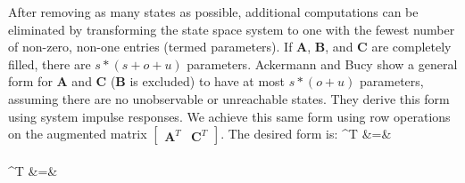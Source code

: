 \label{sec:parameter-reduction}

After removing as many states as possible, additional computations can
be eliminated by transforming the state space system to one with the
fewest number of non-zero, non-one entries (termed parameters). If
$\mathbf{A}$, $\mathbf{B}$, and $\mathbf{C}$ are completely filled,
there are $s*(s+o+u)$ parameters. Ackermann and Bucy
\cite{Ackermann/Bucy} show a general form for $\mathbf{A}$ and
$\mathbf{C}$ ($\mathbf{B}$ is excluded) to have at most $s*(o+u)$
parameters, assuming there are no unobservable or unreachable
states. They derive this form using system impulse responses. We
achieve this same form using row operations on the augmented matrix
$\left [
\begin{array} {cc} \mathbf{A}^T & \mathbf{C}^T \end{array} \right
]$. The desired form is:
\starteqnstar
{}^T &=&  \\ ~ \\
^T &=& 
\doneeqnstar

